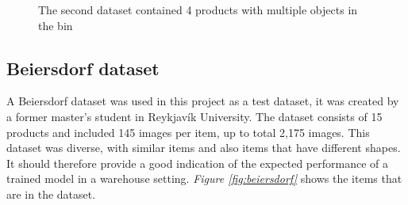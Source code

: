 \begin{figure}[h]
    \hspace{2 cm}
    \hspace{2 cm}
    
    \caption{The second dataset contained 4 products with multiple objects in the bin}
    \label{figure: multiproducts}
\end{figure}

\subsection{Beiersdorf dataset}\label{sec:beiersdorfdataset}
A Beiersdorf dataset\cite{bjarnason_1984-_detecting_2021} was used in this project as a test dataset, it was created by a former master's student in Reykjavík University. 
The dataset consists of 15 products and included 145 images per item, up to total 2,175 images. This dataset was diverse, with similar items and also items that have different shapes. It should therefore provide a good indication of the expected performance of a trained model in a warehouse setting. \textit{Figure \ref{fig:beiersdorf}} shows the items that are in the dataset.


